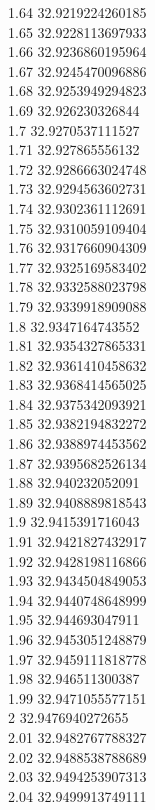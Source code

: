 {1.64	32.9219224260185\\
1.65	32.9228113697933\\
1.66	32.9236860195964\\
1.67	32.9245470096886\\
1.68	32.9253949294823\\
1.69	32.926230326844\\
1.7	32.9270537111527\\
1.71	32.927865556132\\
1.72	32.9286663024748\\
1.73	32.9294563602731\\
1.74	32.9302361112691\\
1.75	32.9310059109404\\
1.76	32.9317660904309\\
1.77	32.9325169583402\\
1.78	32.9332588023798\\
1.79	32.9339918909088\\
1.8	32.9347164743552\\
1.81	32.9354327865331\\
1.82	32.9361410458632\\
1.83	32.9368414565025\\
1.84	32.9375342093921\\
1.85	32.9382194832272\\
1.86	32.9388974453562\\
1.87	32.9395682526134\\
1.88	32.940232052091\\
1.89	32.9408889818543\\
1.9	32.9415391716043\\
1.91	32.9421827432917\\
1.92	32.9428198116866\\
1.93	32.9434504849053\\
1.94	32.9440748648999\\
1.95	32.944693047911\\
1.96	32.9453051248879\\
1.97	32.9459111818778\\
1.98	32.946511300387\\
1.99	32.9471055577151\\
2	32.9476940272655\\
2.01	32.9482767788327\\
2.02	32.9488538788689\\
2.03	32.9494253907313\\
2.04	32.9499913749111\\
}
